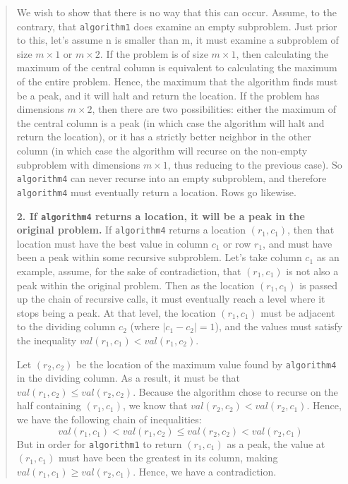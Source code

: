 \documentclass[12pt,twoside]{article}
\begin{document}
\begin{problems}
\begin{quote}
    We wish to show that there is no way that this can occur.
    Assume, to the contrary,
    that \texttt{algorithm1} does examine an empty subproblem.
    Just prior to this, let's assume n is smaller than m,
    it must examine a subproblem of size
    $m \times 1$ or $m \times 2$.
    If the problem is of size $m \times 1$,
    then calculating the maximum of the central column
    is equivalent to calculating the maximum of the entire problem.
    Hence, the maximum that the algorithm finds must be a peak,
    and it will halt and return the location.
    If the problem has dimensions $m \times 2$,
    then there are two possibilities:
    either the maximum of the central column is a peak
    (in which case the algorithm will halt and return the location),
    or it has a strictly better neighbor in the other column
    (in which case the algorithm will recurse
    on the non-empty subproblem with dimensions $m \times 1$,
    thus reducing to the previous case).
    So \texttt{algorithm4} can never recurse into an empty subproblem,
    and therefore \texttt{algorithm4} must eventually return a location.
    Rows go likewise.
    
    {\bf 2. If \texttt{algorithm4} returns a location,
    it will be a peak in the original problem.}
    If \texttt{algorithm4} returns a location $(r_1, c_1)$,
    then that location must have the best value in column $c_1$ or row $r_1$,
    and must have been a peak within some recursive subproblem.
    Let's take column $c_1$ as an example, 
    assume, for the sake of contradiction,
    that $(r_1, c_1)$ is not also a peak within the original problem.
    Then as the location $(r_1, c_1)$ is passed up the chain of recursive calls,
    it must eventually reach a level where it stops being a peak.
    At that level, the location $(r_1, c_1)$
    must be adjacent to the dividing column $c_2$ (where $|c_1 - c_2| = 1$),
    and the values must satisfy the inequality
    $val(r_1, c_1) < val(r_1, c_2)$.
    
    Let $(r_2, c_2)$ be
    the location of the maximum value found by \texttt{algorithm4}
    in the dividing column.
    As a result, it must be that $val(r_1, c_2) \le val(r_2, c_2)$.
    Because the algorithm chose to recurse
    on the half containing $(r_1, c_1)$,
    we know that $val(r_2, c_2) < val(r_2, c_1)$.
    Hence, we have the following chain of inequalities:
    $$val(r_1, c_1) < val(r_1, c_2) \le val(r_2, c_2) < val(r_2, c_1)$$
    But in order for \texttt{algorithm1} to return $(r_1, c_1)$ as a peak,
    the value at $(r_1, c_1)$ must have been the greatest in its column,
    making $val(r_1, c_1) \ge val(r_2, c_1)$.
    Hence, we have a contradiction.
    \end{quote}
\fi


\end{problems}
\end{document}
